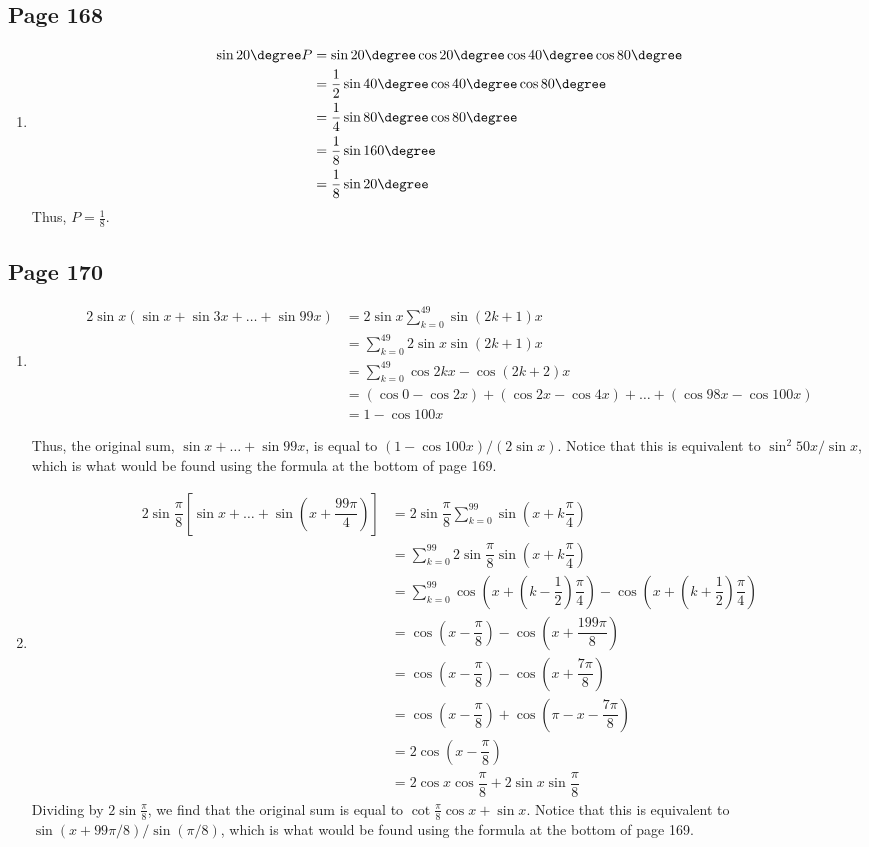 \documentclass{article}
\newenvironment{solutions}[1]
{\subsection*{#1}
 \begin{enumerate}[leftmargin=1.5em]}
{\end{enumerate}}
\newcommand{\solution}{\item}
\begin{document}
\begin{solutions}{Page 168}
\solution %
\begin{align*}
\sin{20\degree} P &= \sin{20\degree}\cos{20\degree}\cos{40\degree}\cos{80\degree} \\
&= \dfrac{1}{2}\sin{40\degree}\cos{40\degree}\cos{80\degree} \\
&= \dfrac{1}{4}\sin{80\degree}\cos{80\degree} \\
&= \dfrac{1}{8}\sin{160\degree} \\
&= \dfrac{1}{8}\sin{20\degree}
\end{align*}
Thus, $P = \tfrac{1}{8}$.
\end{solutions}

\begin{solutions}{Page 170}
\solution %
\begin{align*}
2\sin{x}\left(\sin{x} + \sin{3x} + \ldots + \sin{99x}\right) &= 2\sin{x}\sum_{k=0}^{49} {\sin{\left(2k+1\right)x}} \\
&= \sum_{k=0}^{49} {2\sin{x}\sin{\left(2k+1\right)x}} \\
&= \sum_{k=0}^{49} {\cos{2kx} - \cos{\left(2k+2\right)}x} \\
&= \left(\cos{0} - \cos{2x}\right) + \left(\cos{2x} - \cos{4x}\right) + \ldots + \left(\cos{98x} - \cos{100x}\right)\\
&= 1-\cos{100x}
\end{align*}

Thus, the original sum, $\sin{x}+\ldots+\sin{99x}$, is equal to $\left(1-\cos{100x}\right) / \left(2\sin{x}\right)$. Notice that this is equivalent to $\sin^{2}{50x}/\sin{x}$, which is what would be found using the formula at the bottom of page 169.

\solution %
\begin{align*}
2\sin{\dfrac{\pi}{8}}\left[\sin{x} + \ldots + \sin\left(x+\dfrac{99\pi}{4}\right)\right] &= 2\sin{\dfrac{\pi}{8}} \sum_{k=0}^{99} \sin\left(x+k\dfrac{\pi}{4}\right) \\
&= \sum_{k=0}^{99} 2\sin{\dfrac{\pi}{8}}\sin\left(x+k\dfrac{\pi}{4}\right) \\
&= \sum_{k=0}^{99} \cos\left(x+ \left(k-\dfrac{1}{2}\right)\dfrac{\pi}{4}\right) - \cos\left(x+ \left(k+\dfrac{1}{2}\right)\dfrac{\pi}{4}\right) \\
&= \cos\left(x-\dfrac{\pi}{8}\right) - \cos\left(x + \dfrac{199\pi}{8}\right) \\
&= \cos\left(x-\dfrac{\pi}{8}\right) - \cos\left(x+\dfrac{7\pi}{8}\right) \\
&= \cos\left(x-\dfrac{\pi}{8}\right) + \cos\left(\pi - x - \dfrac{7\pi}{8}\right) \\
&= 2\cos\left(x-\dfrac{\pi}{8}\right) \\
&= 2\cos{x}\cos{\dfrac{\pi}{8}} + 2\sin{x}\sin{\dfrac{\pi}{8}}
\end{align*}
Dividing by $2\sin{\tfrac{\pi}{8}}$, we find that the original sum is equal to $\cot{\tfrac{\pi}{8}}\cos{x} + \sin{x}$. Notice that this is equivalent to $\sin\left(x+99\pi/8\right) / \sin\left(\pi/8\right)$, which is what would be found using the formula at the bottom of page 169.


\end{solutions}
\end{document}
